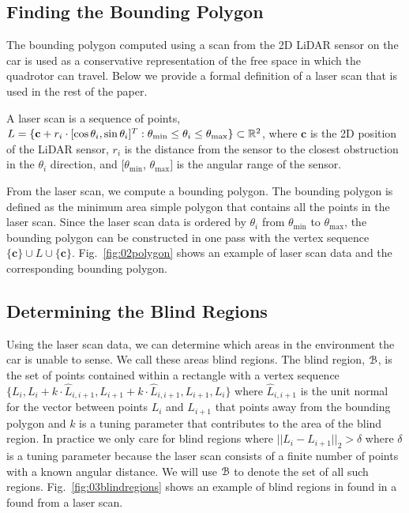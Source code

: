 \subsection{Finding the Bounding Polygon}

\label{sec:poly}

The bounding polygon computed using a scan from the 2D LiDAR sensor on the car
is used as a conservative representation of the free space in which the
quadrotor can travel. Below we provide a formal definition of a laser scan that
is used in the rest of the paper.

\begin{definition}

    A laser scan is a sequence of points, $L = \{\mathbf{c} + r_i \cdot [\cos
    \theta_i, \sin \theta_i] ^ T : \theta_{\min} \leq \theta_i \leq
    \theta_{\max} \} \subset \mathbb{R}^2$, where $\mathbf{c}$ is the 2D position of
    the LiDAR sensor, $r_i$ is the distance from the sensor to the closest
    obstruction in the $\theta_i$ direction, and
    $[\theta_{\min}$, $\theta_{\max}]$ is the angular range of the sensor.

\end{definition}

From the laser scan, we compute a bounding polygon. The bounding
polygon is defined as the minimum area simple polygon that contains all the
points in the laser scan. Since the laser scan data is ordered by $\theta_i$
from $\theta_{\min}$ to $\theta_{\max}$, the bounding polygon can be
constructed in one pass with the vertex sequence $\{\mathbf{c}\} \cup L \cup
\{\mathbf{c}\}$. Fig.~\ref{fig:02polygon} shows an example of laser scan
data and the corresponding bounding polygon.

\subsection{Determining the Blind Regions}

\label{sec:blindregions}

Using the laser scan data, we can determine which areas in the environment the
car is unable to sense. We call these areas blind regions. The blind region,
${{\mathcal{B}}}$, is the set of points contained within a rectangle with a vertex sequence
$\{L_i, L_i + k \cdot \hat{L}_{i, i + 1}, L_{i + 1} + k \cdot \hat{L}_{i, i +
1}, L_{i + 1}, L_i\}$ where $\hat{L}_{i, i + 1}$ is the unit normal for the
vector between points $L_i$ and $L_{i + 1}$ that points away from the bounding
polygon and $k$ is a tuning parameter that contributes to the area of the blind
region. In practice we only care for blind regions where $||L_i - L_{i + 1}||_2
> \delta$ where $\delta$ is a tuning parameter because the laser scan consists
of a finite number of points with a known angular distance. We will use ${{\mathcal{B}}}$ to
denote the set of all such regions.  Fig.~\ref{fig:03blindregions} shows an
example of blind regions in found in a found from a laser scan.

